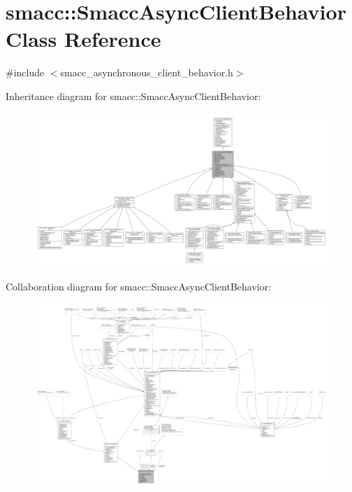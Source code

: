\hypertarget{classsmacc_1_1SmaccAsyncClientBehavior}{}\section{smacc\+:\+:Smacc\+Async\+Client\+Behavior Class Reference}
\label{classsmacc_1_1SmaccAsyncClientBehavior}


{\ttfamily \#include $<$smacc\+\_\+asynchronous\+\_\+client\+\_\+behavior.\+h$>$}



Inheritance diagram for smacc\+:\+:Smacc\+Async\+Client\+Behavior\+:
\nopagebreak
\begin{figure}[H]
\begin{center}
\leavevmode
\includegraphics[width=350pt]{classsmacc_1_1SmaccAsyncClientBehavior__inherit__graph}
\end{center}
\end{figure}


Collaboration diagram for smacc\+:\+:Smacc\+Async\+Client\+Behavior\+:
\nopagebreak
\begin{figure}[H]
\begin{center}
\leavevmode
\includegraphics[width=350pt]{classsmacc_1_1SmaccAsyncClientBehavior__coll__graph}
\end{center}
\end{figure}
